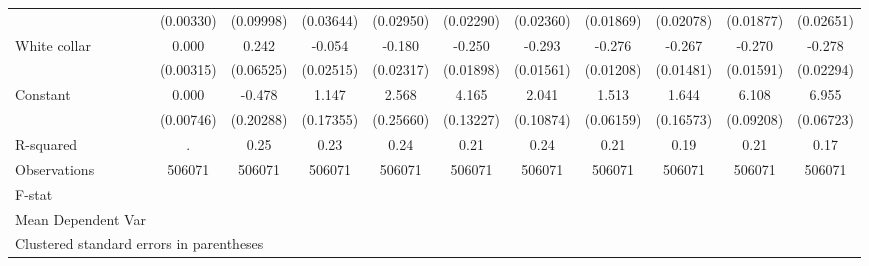 {\begin{tabular}{l*{10}{c}}
                    &   (0.00330)         &   (0.09998)         &   (0.03644)         &   (0.02950)         &   (0.02290)         &   (0.02360)         &   (0.01869)         &   (0.02078)         &   (0.01877)         &   (0.02651)         \\
White collar        &       0.000         &       0.242\sym{***}&      -0.054\sym{*}  &      -0.180\sym{***}&      -0.250\sym{***}&      -0.293\sym{***}&      -0.276\sym{***}&      -0.267\sym{***}&      -0.270\sym{***}&      -0.278\sym{***}\\
                    &   (0.00315)         &   (0.06525)         &   (0.02515)         &   (0.02317)         &   (0.01898)         &   (0.01561)         &   (0.01208)         &   (0.01481)         &   (0.01591)         &   (0.02294)         \\
Constant            &       0.000         &      -0.478\sym{*}  &       1.147\sym{***}&       2.568\sym{***}&       4.165\sym{***}&       2.041\sym{***}&       1.513\sym{***}&       1.644\sym{***}&       6.108\sym{***}&       6.955\sym{***}\\
                    &   (0.00746)         &   (0.20288)         &   (0.17355)         &   (0.25660)         &   (0.13227)         &   (0.10874)         &   (0.06159)         &   (0.16573)         &   (0.09208)         &   (0.06723)         \\
\hline
R-squared           &           .         &        0.25         &        0.23         &        0.24         &        0.21         &        0.24         &        0.21         &        0.19         &        0.21         &        0.17         \\
Observations        &      506071         &      506071         &      506071         &      506071         &      506071         &      506071         &      506071         &      506071         &      506071         &      506071         \\
F-stat              &                     &                     &                     &                     &                     &                     &                     &                     &                     &                     \\
Mean Dependent Var  &                     &                     &                     &                     &                     &                     &                     &                     &                     &                     \\
\hline\hline
\multicolumn{11}{l}{\footnotesize Clustered standard errors in parentheses}\\
\end{tabular}
}
